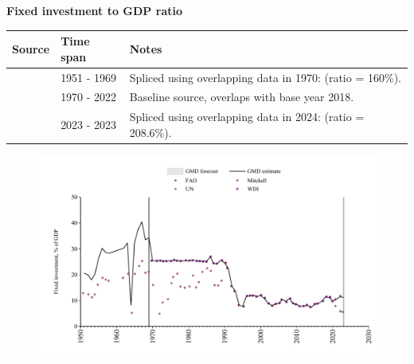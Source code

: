 \documentclass[12pt,a4paper,landscape]{article}
\begin{document}
\begin{adjustbox}{max totalsize={\paperwidth}{\paperheight},center}
\begin{minipage}[t][\textheight][t]{\textwidth}
\vspace*{0.5cm}
{}
\begin{center}
{\Large\bfseries Fixed investment to GDP ratio}
\end{center}
\vspace{0.5cm}
\begin{table}[H]
\centering
\small
\begin{tabular}{|l|l|l|}
\hline
\textbf{Source} & \textbf{Time span} & \textbf{Notes} \\
\hline
\rowcolor{white}\cite{Mitchell}& 1951 - 1969 &Spliced using overlapping data in 1970: (ratio = 160\%). \\
\rowcolor{lightgray}\cite{WDI}& 1970 - 2022 &Baseline source, overlaps with base year 2018. \\
\rowcolor{white}\cite{FAO}& 2023 - 2023 &Spliced using overlapping data in 2024: (ratio = 208.6\%). \\
\hline
\end{tabular}
\end{table}
\begin{figure}[H]
\centering
\includegraphics[width=\textwidth,height=0.6\textheight,keepaspectratio]{graphs/CUB_finv_GDP.pdf}
\end{figure}
\end{minipage}
\end{adjustbox}
\end{document}
